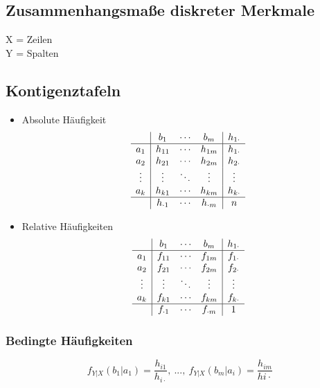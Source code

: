 \documentclass[10pt,a4paper,landscape]{article}
\begin{document}
\begin{multicols}{4}

\section{Zusammenhangsmaße diskreter Merkmale}
X = Zeilen \\
Y = Spalten
\subsection{Kontigenztafeln}
\begin{itemize}
\item Absolute Häufigkeit
\[
\begin{array}{c|ccc|c}
  & b_1 & \cdots & b_m & h_{1\cdot} \\
\hline
a_1 & h_{11} & \cdots & h_{1m} & h_{1\cdot} \\
a_2 & h_{21} & \cdots & h_{2m} & h_{2\cdot} \\
\vdots & \vdots & \ddots & \vdots & \vdots \\
a_k & h_{k1} & \cdots & h_{km} & h_{k\cdot} \\
\hline
  & h_{\cdot 1} & \cdots & h_{\cdot m} & n
\end{array}
\]

\item Relative Häufigkeiten
\[
\begin{array}{c|ccc|c}
  & b_1 & \cdots & b_m & h_{1\cdot} \\
\hline
a_1 & f_{11} & \cdots & f_{1m} & f_{1\cdot} \\
a_2 & f_{21} & \cdots & f_{2m} & f_{2\cdot} \\
\vdots & \vdots & \ddots & \vdots & \vdots \\
a_k & f_{k1} & \cdots & f_{km} & f_{k\cdot} \\
\hline
  & f_{\cdot 1} & \cdots & f_{\cdot m} & 1
\end{array}
\]

\end{itemize}

\subsubsection*{Bedingte Häufigkeiten}

\[
f_{Y|X}(b_1|a_1)=\frac{h_{i1}}{h_{i\cdot}},~...,~ f_{Y|X}(b_m|a_i)=\frac{h_{im}}{h{i\cdot}}
\]


\end{multicols}
\end{document}
